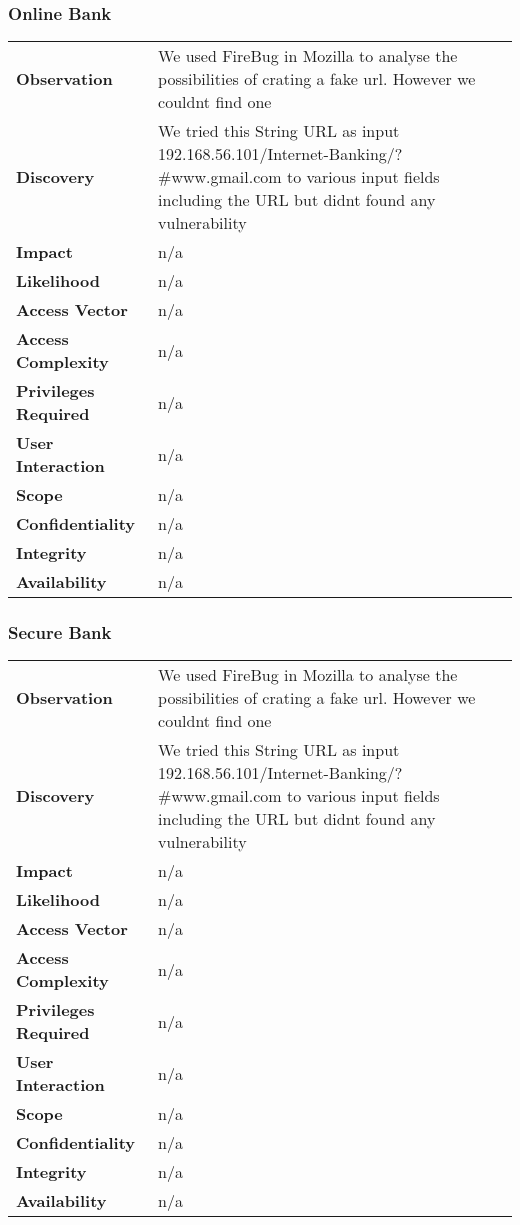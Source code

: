 \subsubsection{Online Bank}
\begin{tabular}{l|p{10cm}}
\textbf{Observation} & We used FireBug in Mozilla to analyse the possibilities of crating a fake url. However we couldnt find one  \\
\textbf{Discovery} & We tried this String URL as input 192.168.56.101/Internet-Banking/?#www.gmail.com to various input fields including the URL but didnt found any vulnerability \\
\textbf{Impact} &  n/a\\
\textbf{Likelihood} & n/a \\
\textbf{Access Vector} & n/a \\
\textbf{Access Complexity} & n/a \\
\textbf{Privileges Required} & n/a \\
\textbf{User Interaction} & n/a \\
\textbf{Scope} & n/a \\
\textbf{Confidentiality} & n/a \\
\textbf{Integrity} & n/a \\
\textbf{Availability} & n/a \\
\end{tabular}

\subsubsection{Secure Bank}
\begin{tabular}{l|p{10cm}}
\textbf{Observation} &  We used FireBug in Mozilla to analyse the possibilities of crating a fake url. However we couldnt find one \\
\textbf{Discovery} & We tried this String URL as input 192.168.56.101/Internet-Banking/?#www.gmail.com to various input fields including the URL but didnt found any vulnerability \\
\textbf{Impact} &  n/a\\
\textbf{Likelihood} & n/a \\
\textbf{Access Vector} & n/a \\
\textbf{Access Complexity} & n/a \\
\textbf{Privileges Required} & n/a \\
\textbf{User Interaction} & n/a \\
\textbf{Scope} & n/a \\
\textbf{Confidentiality} & n/a \\
\textbf{Integrity} & n/a \\
\textbf{Availability} & n/a \\
\end{tabular}

